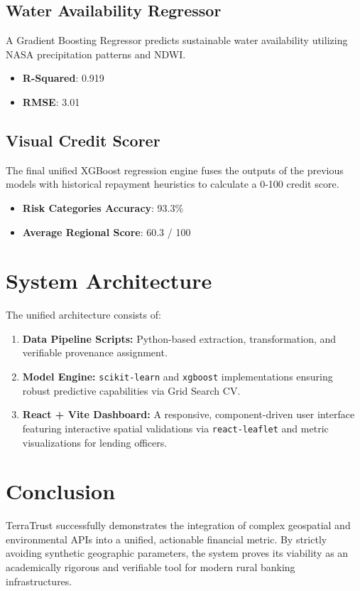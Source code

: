\documentclass[12pt,a4paper]{article}
\begin{document}
\subsection{Water Availability Regressor}
A Gradient Boosting Regressor predicts sustainable water availability utilizing NASA precipitation patterns and NDWI.
\begin{itemize}
    \item \textbf{R-Squared}: 0.919
    \item \textbf{RMSE}: 3.01
\end{itemize}

\subsection{Visual Credit Scorer}
The final unified XGBoost regression engine fuses the outputs of the previous models with historical repayment heuristics to calculate a 0-100 credit score.
\begin{itemize}
    \item \textbf{Risk Categories Accuracy}: 93.3\%
    \item \textbf{Average Regional Score}: 60.3 / 100
\end{itemize}

\section{System Architecture}
The unified architecture consists of:
\begin{enumerate}
    \item \textbf{Data Pipeline Scripts:} Python-based extraction, transformation, and verifiable provenance assignment.
    \item \textbf{Model Engine:} \texttt{scikit-learn} and \texttt{xgboost} implementations ensuring robust predictive capabilities via Grid Search CV.
    \item \textbf{React + Vite Dashboard:} A responsive, component-driven user interface featuring interactive spatial validations via \texttt{react-leaflet} and metric visualizations for lending officers.
\end{enumerate}

\section{Conclusion}
TerraTrust successfully demonstrates the integration of complex geospatial and environmental APIs into a unified, actionable financial metric. By strictly avoiding synthetic geographic parameters, the system proves its viability as an academically rigorous and verifiable tool for modern rural banking infrastructures.
\end{document}
